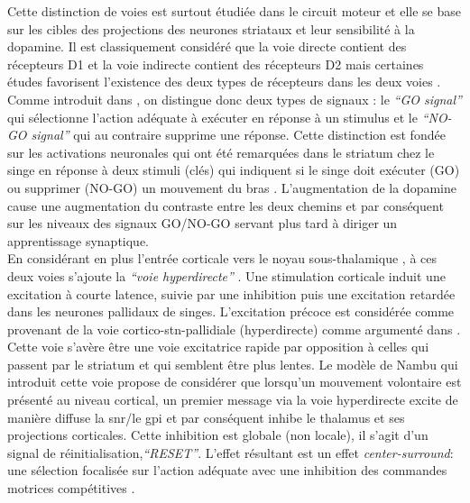 Cette distinction de voies est surtout étudiée dans le circuit moteur et elle se base sur les cibles des projections des neurones striataux et leur sensibilité à la dopamine. Il est classiquement considéré que la voie directe contient des récepteurs D1 et la voie indirecte contient des récepteurs D2 \cite{Ince:1997, Gerfen:1995, Bloch:1994, Gerfen:1994} mais certaines études favorisent l'existence des deux types de récepteurs dans les deux voies \cite{Aizman:2000,Surmeier:1996}. Comme introduit dans \cite{Frank:2005}, on distingue donc deux types de signaux : le \textit{``GO signal''} qui sélectionne l'action adéquate à exécuter en réponse à un stimulus et le \textit{ ``NO-GO signal''} qui au contraire supprime une réponse. Cette distinction est fondée sur les activations neuronales qui ont été remarquées dans le striatum chez le singe en réponse à deux stimuli (clés) qui indiquent si le singe doit exécuter (GO) ou supprimer (NO-GO) un mouvement du bras \cite{Apicella:1992}. L'augmentation de la dopamine cause une augmentation du contraste entre les deux chemins et par conséquent sur les niveaux des signaux GO/NO-GO servant plus tard à diriger un apprentissage synaptique.\\

En considérant en plus l'entrée corticale vers le noyau sous-thalamique \cite{Mink:1993,Kita:1994, Mink:1996, Nambu:2000}, à ces deux voies s'ajoute la \textit{``voie hyperdirecte''} \cite{Nambu:2002, Joel:1997, Gerfen:2000}. Une stimulation corticale induit une excitation à courte latence, suivie par une inhibition puis une excitation retardée dans les neurones pallidaux de singes. L'excitation précoce est considérée comme provenant de la voie cortico-\gls{stn}-pallidiale (hyperdirecte) comme argumenté dans \cite{Nambu:2000}. Cette voie s'avère être une voie excitatrice rapide par opposition à celles qui passent par le striatum et qui semblent être plus lentes. Le modèle de Nambu qui introduit cette voie propose de considérer que lorsqu'un mouvement volontaire est présenté au niveau cortical, un premier message via la voie hyperdirecte excite de manière diffuse la \gls{snr}/le \gls{gpi} et par conséquent inhibe le thalamus et ses projections corticales. Cette inhibition est globale (non locale), il s'agit d'un signal de réinitialisation,\textit{``RESET''}. L'effet résultant est un effet {\em center-surround}: une sélection focalisée sur l'action adéquate avec une inhibition des commandes motrices compétitives \cite{Mink:1993, Mink:1996,Hikosaka:2000, Chevalier:1990, Hikosaka:1988}. \\

